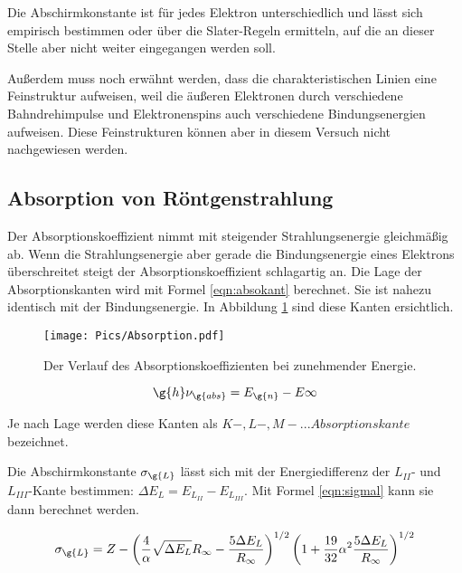 Die Abschirmkonstante ist für jedes Elektron unterschiedlich und lässt sich empirisch
bestimmen oder über die Slater-Regeln ermitteln, auf die an dieser Stelle aber nicht
weiter eingegangen werden soll.

Außerdem muss noch erwähnt werden, dass die charakteristischen Linien eine Feinstruktur
aufweisen, weil die äußeren Elektronen durch verschiedene Bahndrehimpulse und Elektronenspins
auch verschiedene Bindungsenergien aufweisen. Diese Feinstrukturen können aber in diesem Versuch nicht nachgewiesen
werden.

\subsection{Absorption von Röntgenstrahlung}

Der Absorptionskoeffizient nimmt mit steigender Strahlungsenergie gleichmäßig ab. Wenn die
Strahlungsenergie aber gerade die Bindungsenergie eines Elektrons überschreitet steigt der
Absorptionskoeffizient schlagartig an.
Die Lage der Absorptionskanten wird mit Formel \eqref{eqn:absokant} berechnet. Sie ist nahezu
identisch mit der Bindungsenergie. In Abbildung \ref{fig:absokant} sind diese Kanten
ersichtlich.

\begin{figure}
  \centering
  \texttt{[image: Pics/Absorption.pdf]}
  \caption{Der Verlauf des Absorptionskoeffizienten bei zunehmender Energie. \cite{anleitung}}
  \label{fig:absokant}
\end{figure}

\begin{equation}
  \g{h} \nu_{\g{abs}} = E_{\g{n}} - E{\infty}
  \label{eqn:absokant}
\end{equation}

Je nach Lage werden diese Kanten als $K-,L-,M-...Absorptionskante$ bezeichnet.

Die Abschirmkonstante $\sigma_{\g{L}}$ lässt sich mit der Energiedifferenz der $L_{II}$-
und $L_{III}$-Kante bestimmen: $\Delta E_{L} = E_{L_{II}} - E_{L_{III}}$.
Mit Formel \eqref{eqn:sigmal} kann sie dann berechnet werden.

\begin{equation}
  \sigma_{\g{L}} = Z - \left(\frac{4}{\alpha} \sqrt{\Delta E_{L}} R_{\infty} -
  \frac{5 \Delta E_{L}}{R_{\infty}} \right)^{1/2} \left(1 + \frac{19}{32} \alpha^2 \frac{5 \Delta E_{L}}{R_{\infty}} \right)^{1/2}
  \label{eqn:sigmal}
\end{equation}


